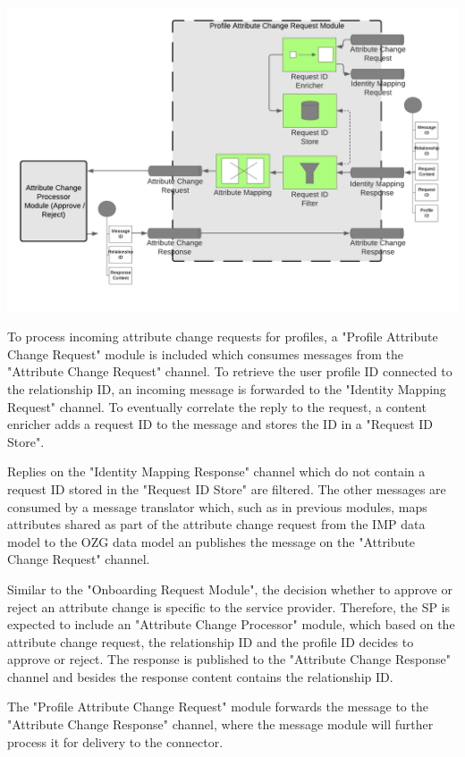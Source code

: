 \begin{center}
    \includegraphics[scale=0.6]{Diagrams/Integration Architecture 1/Technological Integration/10. Attribute Change Request Module.pdf}
\end{center}

To process incoming attribute change requests for profiles, a "Profile Attribute Change Request" module is included which consumes messages from the "Attribute Change Request" channel. To retrieve the user profile ID connected to the relationship ID, an incoming message is forwarded to the "Identity Mapping Request" channel. To eventually correlate the reply to the request, a content enricher adds a request ID to the message and stores the ID in a "Request ID Store".

Replies on the "Identity Mapping Response" channel which do not contain a request ID stored in the "Request ID Store" are filtered. The other messages are consumed by a message translator which, such as in previous modules, maps attributes shared as part of the attribute change request from the IMP data model to the OZG data model an publishes the message on the "Attribute Change Request" channel.

Similar to the "Onboarding Request Module", the decision whether to approve or reject an attribute change is specific to the service provider. Therefore, the SP is expected to include an "Attribute Change Processor" module, which based on the attribute change request, the relationship ID and the profile ID decides to approve or reject. The response is published to the "Attribute Change Response" channel and besides the response content contains the relationship ID.

The "Profile Attribute Change Request" module forwards the message to the "Attribute Change Response" channel, where the message module will further process it for delivery to the connector.

